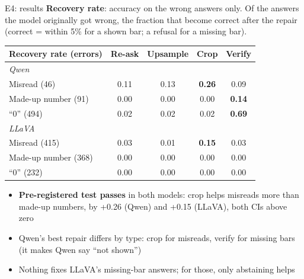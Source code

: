 \documentclass[10pt,aspectratio=169]{beamer}
\newcommand{\hl}[1]{\alert{\textbf{#1}}}
\begin{document}
\begin{frame}{E4: results}
\footnotesize
\textbf{Recovery rate}: accuracy on the wrong answers only. Of the answers the
model originally got wrong, the fraction that become correct after the repair
(correct = within 5\% for a shown bar; a refusal for a missing bar).
\vspace{0.3em}

\centering
{\renewcommand{\arraystretch}{0.9}
\begin{tabular}{lcccc}
\toprule
Recovery rate (errors) & Re-ask & Upsample & Crop & Verify \\
\midrule
\multicolumn{5}{l}{\textit{Qwen}} \\
Misread (46) & 0.11 & 0.13 & \hl{0.26} & 0.09 \\
Made-up number (91) & 0.00 & 0.00 & 0.00 & \hl{0.14} \\
``0'' (494) & 0.02 & 0.02 & 0.02 & \hl{0.69} \\
\multicolumn{5}{l}{\textit{LLaVA}} \\
Misread (415) & 0.03 & 0.01 & \hl{0.15} & 0.03 \\
Made-up number (368) & 0.00 & 0.00 & 0.00 & 0.00 \\
``0'' (232) & 0.00 & 0.00 & 0.00 & 0.00 \\
\bottomrule
\end{tabular}}
\vspace{0.2em}
\raggedright
\begin{itemize}\footnotesize
\item \textbf{Pre-registered test passes} in both models: crop helps misreads more
than made-up numbers, by +0.26 (Qwen) and +0.15 (LLaVA), both CIs above zero
\item Qwen's best repair differs by type: crop for misreads, verify for missing
bars (it makes Qwen say ``not shown'')
\item Nothing fixes LLaVA's missing-bar answers; for those, only abstaining helps
\end{itemize}
\end{frame}
\end{document}
